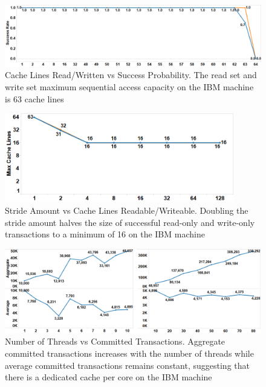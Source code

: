 \begin{figure}[]%
\centering
\includegraphics[width=\linewidth]{images/wttm_capacity_readwrite_ibm}
\caption{Cache Lines Read/Written vs Success Probability. 
The read set and write set maximum sequential access capacity on the
IBM machine is 63 cache lines}
\label{fig:wttm_capacity_readwrite_ibm}
\end{figure}

\begin{figure}[]%
\centering
\includegraphics[width=100mm]{images/wttm_stride_readwrite_ibm}
\caption{Stride Amount vs Cache Lines Readable/Writeable. 
Doubling the stride amount halves the size of successful read-only and
write-only transactions to a minimum of 16 on the IBM machine}
\label{fig:wttm_stride_readwrite_ibm}
\end{figure}

\begin{figure}[]%
\centering
\includegraphics[width=\linewidth]{images/wttm_core_or_thread_ibm}
\caption{Number of Threads vs Committed Transactions. 
Aggregate committed transactions increases with the number of threads
while average committed transactions remains constant, suggesting that there is
a dedicated cache per core on the IBM machine}
\label{fig:wttm_core_or_thread_ibm}
\end{figure}

